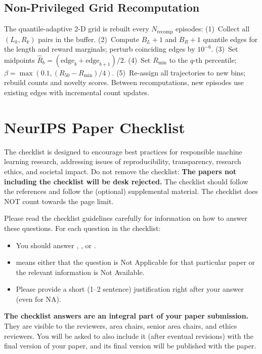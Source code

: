 \documentclass{article}
\begin{document}
\subsection{Non-Privileged Grid Recomputation}
\label{app:grid}

The quantile-adaptive 2-D grid is rebuilt every $N_{\mathrm{recomp}}$
episodes:
(1)~Collect all $(L_k,R_k)$ pairs in the buffer.
(2)~Compute $B_L{+}1$ and $B_R{+}1$ quantile edges for the length
  and reward marginals; perturb coinciding edges by $10^{-6}$.
(3)~Set midpoints
  $\hat{R}_b=(\text{edge}_b{+}\text{edge}_{b+1})/2$.
(4)~Set $R_{\min}$ to the $q$-th percentile;
  $\beta=\max(0.1,(R_{50}{-}R_{\min})/4)$.
(5)~Re-assign all trajectories to new bins; rebuild counts and
  novelty scores.
Between recomputations, new episodes use existing edges with
incremental count updates.



\newpage
\section*{NeurIPS Paper Checklist}

The checklist is designed to encourage best practices for responsible machine learning research, addressing issues of reproducibility, transparency, research ethics, and societal impact. Do not remove the checklist: {\bf The papers not including the checklist will be desk rejected.} The checklist should follow the references and follow the (optional) supplemental material.  The checklist does NOT count towards the page
limit. 

Please read the checklist guidelines carefully for information on how to answer these questions. For each question in the checklist:
\begin{itemize}
    \item You should answer \answerYes{}, \answerNo{}, or \answerNA{}.
    \item \answerNA{} means either that the question is Not Applicable for that particular paper or the relevant information is Not Available.
    \item Please provide a short (1–2 sentence) justification right after your answer (even for NA). 
\end{itemize}

{\bf The checklist answers are an integral part of your paper submission.} They are visible to the reviewers, area chairs, senior area chairs, and ethics reviewers. You will be asked to also include it (after eventual revisions) with the final version of your paper, and its final version will be published with the paper.
\end{document}
